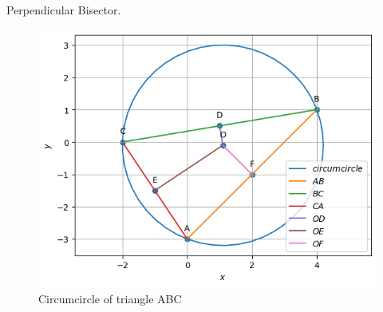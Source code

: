 \begin{table}[H]
        \centering
        
        \caption{Perpendicular Bisector.}
        \label{tab:perp-bisec}
    \end{table}
\begin{figure}[H]
	\includegraphics[width=\columnwidth]{perp_bisec/figs/perp_bisec.png}
\caption{Circumcircle of triangle ABC}
\label{fig:i_perp_bisec_py}
\end{figure}

